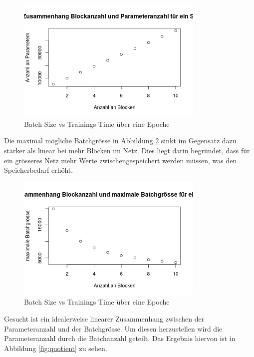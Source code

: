 \begin{figure}[h]
 \centering
 \includegraphics[width=0.8\textwidth]{KapitelPartB/Images/linearBlocks.png}
 \caption{Batch Size vs Trainings Time über eine Epoche}
 \label{fig:linearBlocks}
\end{figure}




Die maximal mögliche Batchgrösse in Abbildung \ref{fig:maxBatchSize} sinkt im Gegensatz dazu stärker als linear bei mehr Blöcken im Netz. Dies liegt darin begründet, dass für ein grösseres Netz mehr Werte zwischengespeichert werden müssen, was den Speicherbedarf erhöht.

\begin{figure}[h]
 \centering
 \includegraphics[width=0.8\textwidth]{KapitelPartB/Images/maxBatchSize.png}
 \caption{Batch Size vs Trainings Time über eine Epoche}
 \label{fig:maxBatchSize}
\end{figure}




Gesucht ist ein idealerweise linearer Zusammenhang zwischen der Parameteranzahl und der Batchgrösse. Um diesen herzustellen wird die Parameteranzahl durch die Batchanzahl geteilt. Das Ergebnis hiervon ist in Abbildung \ref{fig:quotient} zu sehen.

